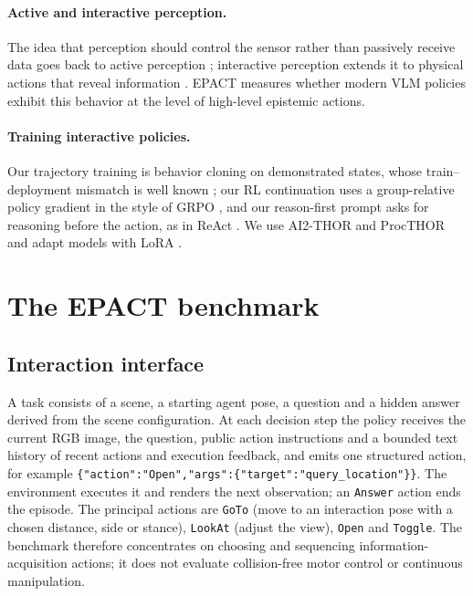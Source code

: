 \documentclass{article}
\begin{document}
\paragraph{Active and interactive perception.} The idea that perception should control the sensor rather than passively receive data goes back to active perception \citep{bajcsy1988active}; interactive perception extends it to physical actions that reveal information \citep{bohg2017interactive}. EPACT measures whether modern VLM policies exhibit this behavior at the level of high-level epistemic actions.

\paragraph{Training interactive policies.} Our trajectory training is behavior cloning on demonstrated states, whose train--deployment mismatch is well known \citep{ross2011reduction}; our RL continuation uses a group-relative policy gradient in the style of GRPO \citep{shao2024deepseekmath}, and our reason-first prompt asks for reasoning before the action, as in ReAct \citep{yao2023react}. We use AI2-THOR and ProcTHOR \citep{kolve2017ai2thor,deitke2022procthor} and adapt models with LoRA \citep{hu2022lora}.

\section{The EPACT benchmark}
\label{sec:bench}

\subsection{Interaction interface}
A task consists of a scene, a starting agent pose, a question and a hidden answer derived from the scene configuration. At each decision step the policy receives the current RGB image, the question, public action instructions and a bounded text history of recent actions and execution feedback, and emits one structured action, for example \texttt{\{"action":"Open","args":\{"target":"query\_location"\}\}}. The environment executes it and renders the next observation; an \texttt{Answer} action ends the episode. The principal actions are \texttt{GoTo} (move to an interaction pose with a chosen distance, side or stance), \texttt{LookAt} (adjust the view), \texttt{Open} and \texttt{Toggle}. The benchmark therefore concentrates on choosing and sequencing information-acquisition actions; it does not evaluate collision-free motor control or continuous manipulation.
\end{document}
